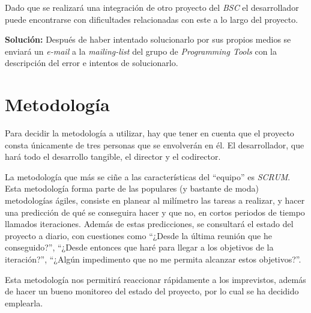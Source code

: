 \documentclass[a4paper]{article}
\begin{document}
Dado que se realizará una integración de otro proyecto del \textit{BSC} el desarrollador puede encontrarse con dificultades relacionadas con este a lo largo del proyecto.
\par\medskip

\textbf{Solución:} Después de haber intentado solucionarlo por sus propios medios se enviará un \textit{e-mail} a la \textit{mailing-list} del grupo de \textit{Programming Tools} con la descripción del error e intentos de solucionarlo.

\section{Metodología}

Para decidir la metodología a utilizar, hay que tener en cuenta que el proyecto consta únicamente de tres personas que se envolverán en él. El desarrollador, que hará todo el desarrollo tangible, el director y el codirector. %
\par\bigskip

La metodología que más se ciñe a las características del ``equipo'' es \textit{SCRUM}. Esta metodología forma parte de las populares (y bastante de moda) metodologías ágiles, consiste en planear al milímetro las tareas a realizar, y hacer una predicción de qué se conseguira hacer y que no, en cortos periodos de tiempo llamados iteraciones. Además de estas predicciones, se consultará el estado del proyecto a diario, con cuestiones como ``¿Desde la última reunión que he conseguido?'', ``¿Desde entonces que haré para llegar a los objetivos de la iteración?'', ``¿Algún impedimento que no me permita alcanzar estos objetivos?''.
\par\bigskip

Esta metodología nos permitirá reaccionar rápidamente a los imprevistos, además de hacer un bueno monitoreo del estado del proyecto, por lo cual se ha decidido emplearla.



















\printbibliography
\end{document}
